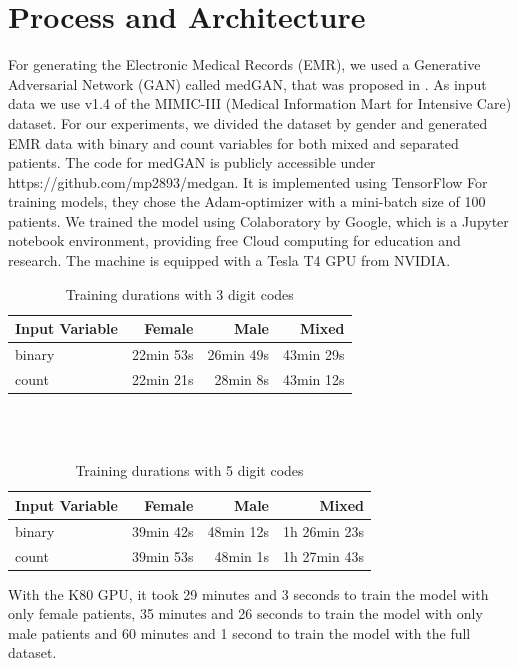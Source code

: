 \documentclass[11pt, a4paper]{book}
\begin{document}
\section{Process and Architecture}
For generating the Electronic Medical Records (EMR), we used a Generative Adversarial Network (GAN) called medGAN, that was proposed in \cite{Choi2017}. As input data we use v1.4 of the MIMIC-III (Medical Information Mart for Intensive Care) dataset. For our experiments, we divided the dataset by gender and generated EMR data with binary and count variables for both mixed and separated patients. The code for medGAN is publicly accessible under https://github.com/mp2893/medgan. It is implemented using TensorFlow
For training models, they chose the Adam-optimizer with a mini-batch size of 100 patients. \cite{Choi2017} We trained the model using Colaboratory by Google, which is a Jupyter notebook environment, providing free Cloud computing for education and research.
The machine is equipped with a Tesla T4 GPU from NVIDIA.

\begin{table}
\begin{center}
\begin{tabularx}{\textwidth}{X|r|r|r}
Input Variable & Female & Male & Mixed \\
\hline
binary & 22min 53s & 26min 49s & 43min 29s\\
count & 22min 21s & 28min 8s & 43min 12s\\
\end{tabularx}
\caption{Training durations with 3 digit codes}
\end{center}
\end{table}
\\
\\
\begin{table}
\begin{center}
\begin{tabularx}{\textwidth}{X|r|r|r}
Input Variable & Female & Male & Mixed \\
\hline
binary & 39min 42s & 48min 12s & 1h 26min 23s\\
count & 39min 53s & 48min 1s & 1h 27min 43s\\
\end{tabularx}
\caption{Training durations with 5 digit codes}
\end{center}
\end{table}


With the K80 GPU, it took 29 minutes and 3 seconds to train the model with only female patients, 35 minutes and 26 seconds to train the model with only male patients and 60 minutes and 1 second to train the model with the full dataset.
\end{document}
